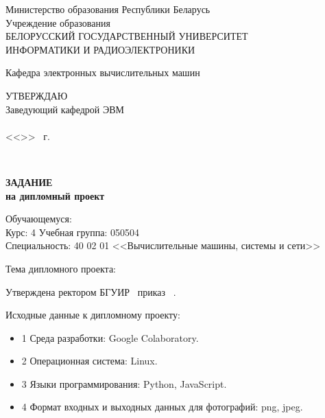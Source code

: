     \begin{center}
      Министерство образования Республики Беларусь\\[1em]
      Учреждение образования\\
      БЕЛОРУССКИЙ ГОСУДАРСТВЕННЫЙ УНИВЕРСИТЕТ \\
      ИНФОРМАТИКИ И РАДИОЭЛЕКТРОНИКИ\\[1em]
    \end{center}

    \begin{center}
      Кафедра электронных вычислительных машин
    \end{center}

    \begin{flushright}
      \begin{minipage}{0.4\textwidth}
        \MakeUppercase{Утверждаю}\\
        Заведующий кафедрой ЭВМ\\
        \underline{\hspace*{2.2cm}} \headOfDepartmentShort \\
        <<\underline{\hspace*{1cm}}>> \underline{\hspace*{2.5cm}} \targetYear\ г.
      \end{minipage}\\[1em]
    \end{flushright}

    \begin{center}
      \textbf{ЗАДАНИЕ}\\
      \textbf{на дипломный проект}\\[1em]
    \end{center}

    \noindent
    Обучающемуся: \studentFullParental \\
    Курс: 4 \hspace*{2ex} Учебная группа: 050504 \\
    Специальность: 40 02 01 <<Вычислительные машины, системы и сети>>

    \vspace{1em}
    \noindent
    Тема дипломного проекта: \taskNameFull

    \vspace{1em}
    \noindent
    Утверждена ректором БГУИР \uniDecreeDate \ приказ \textnumero \ \uniDecreeNumber.

    \vspace{1em}
    \noindent
    Исходные данные к дипломному проекту:
    \begin{itemize}[label={}, itemindent=\parindent]
      \item 1 Среда разработки: Google Colaboratory.
      \item 2 Операционная система: Linux.
      \item 3 Языки программирования: Python, JavaScript.
      \item 4 Формат входных и выходных данных для фотографий: png, jpeg.
    \end{itemize}

